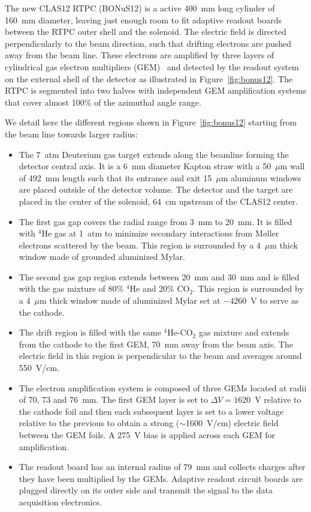 The new CLAS12 RTPC (BONuS12) is a active 400~mm long cylinder of 160~mm 
diameter, leaving just enough room to fit adaptive readout boards between the 
RTPC outer shell and the solenoid. The electric field is directed 
perpendicularly to the beam direction, such that drifting electrons are pushed 
away from the beam line. These electrons are amplified by three layers of 
cylindrical gas electron multipliers (GEM)~\cite{Sauli:2016eeu} and detected by 
the readout system on the external shell of the detector as illustrated in 
Figure~\ref{fig:bonus12}.  The RTPC is segmented into two halves with 
independent GEM amplification systems that cover almost 100\% of the azimuthal 
angle range.

We detail here the different regions shown in Figure~\ref{fig:bonus12} starting 
from the beam line towards larger radius:\\
\begin{itemize}
  \item The 7~atm Deuterium gas target extends along the beamline forming the 
     detector central axis. It is a 6~mm diameter Kapton straw with a 50~$\mu$m 
      wall of 492~mm length such that its entrance and exit 15~$\mu$m aluminum 
      windows are placed outside of the detector volume.  The detector and the 
      target are placed in the center of the solenoid, 64~cm upstream of the 
      CLAS12 center.
   \item The first gas gap covers the radial range from 3~mm to 20~mm. It is 
      filled with $^{4}$He gas at 1~atm to minimize secondary interactions from
      M\o{}ller electrons scattered by the beam. This region is surrounded by a 
      4~$\mu$m thick window made of grounded aluminized Mylar.
   \item The second gas gap region extends between 20~mm and 30~mm and is 
      filled with the gas mixture of 80$\%$ $^{4}$He and 20$\%$ CO$_2$. This 
      region is surrounded by a 4~$\mu$m thick window made of aluminized Mylar 
      set at $-4260$~V to serve as the cathode.
   \item The drift region is filled with the same $^4$He-CO$_2$ gas mixture and 
      extends from the cathode to the first GEM, 70~mm away from the beam axis.  
      The electric field in this region is perpendicular to the beam and 
      averages around 550~V/cm.
   \item The electron amplification system is composed of three GEMs located at 
      radii of 70, 73 and 76~mm. The first GEM layer is set to $\Delta 
      V=1620$~V relative to the cathode foil and then each subsequent layer is 
      set to a lower voltage relative to the previous to obtain a strong 
      ($\sim$1600~V/cm) electric field between the GEM foils. A 275~V bias is 
      applied across each GEM for amplification.
   \item The readout board has an internal radius of 79~mm and collects charges 
      after they have been multiplied by the GEMs. Adaptive readout circuit 
      boards are plugged directly on its outer side and transmit the signal to 
      the data acquisition electronics.
\end{itemize}











